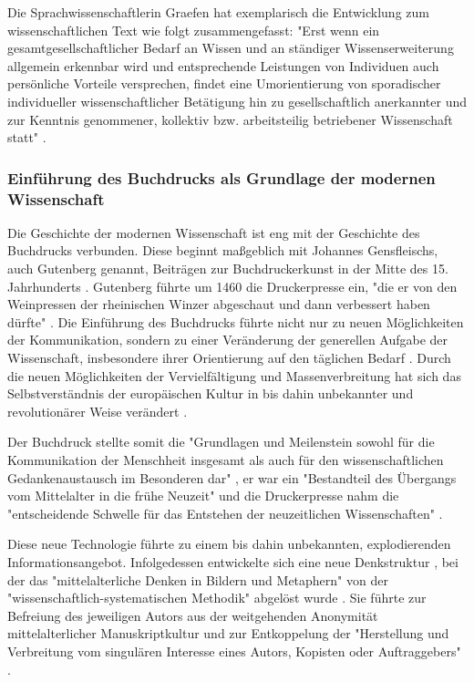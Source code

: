 Die Sprachwissenschaftlerin Graefen hat exemplarisch die Entwicklung zum wissenschaftlichen Text wie folgt zusammengefasst: "Erst wenn ein gesamtgesellschaftlicher Bedarf an Wissen und an ständiger Wissenserweiterung allgemein erkennbar wird und entsprechende Leistungen von Individuen auch persönliche Vorteile versprechen, findet eine Umorientierung von sporadischer individueller wissenschaftlicher Betätigung hin zu gesellschaftlich anerkannter und zur Kenntnis genommener, kollektiv bzw. arbeitsteilig betriebener Wissenschaft statt" \cite{Graefen_2007}.

\subsubsection{Einführung des Buchdrucks als Grundlage der modernen Wissenschaft}

Die Geschichte der modernen Wissenschaft ist eng mit der Geschichte des Buchdrucks verbunden. Diese beginnt maßgeblich mit Johannes Gensfleischs, auch Gutenberg genannt, Beiträgen zur Buchdruckerkunst in der Mitte des 15. Jahrhunderts \cite{Wittmann_1999}. Gutenberg führte um 1460 die Druckerpresse ein, "die er von den Weinpressen der rheinischen Winzer abgeschaut und dann verbessert haben dürfte" \cite{Stober_2014}. Die Einführung des Buchdrucks führte nicht nur zu neuen Möglichkeiten der Kommunikation, sondern zu einer Veränderung der generellen Aufgabe der Wissenschaft, insbesondere ihrer Orientierung auf den täglichen Bedarf \cite[:148]{Luhmann_1998}. Durch die neuen Möglichkeiten der Vervielfältigung und Massenverbreitung hat sich das Selbstverständnis der europäischen Kultur in bis dahin unbekannter \cite{Giesecke_1991} und revolutionärer Weise verändert \cite{Wunderlich_2008} \cite{Stober_2014} \cite[:211]{Porter_1964}.

Der Buchdruck stellte somit die "Grundlagen und Meilenstein sowohl für die Kommunikation der Menschheit insgesamt als auch für den wissenschaftlichen Gedankenaustausch im Besonderen dar" \cite{Schirmbacher_2009}, er war ein "Bestandteil des Übergangs vom Mittelalter in die frühe Neuzeit" \cite{Lange_2008} und die Druckerpresse nahm die "entscheidende Schwelle für das Entstehen der neuzeitlichen Wissenschaften" \cite{Luhmann_1997}.

Diese neue Technologie führte zu einem bis dahin unbekannten, explodierenden Informationsangebot. Infolgedessen entwickelte sich eine neue Denkstruktur \cite{Eisenstein_1997}, bei der das "mittelalterliche Denken in Bildern und Metaphern" von der "wissenschaftlich-systematischen Methodik" abgelöst wurde \cite{Wunderlich_2008}. Sie führte zur Befreiung des jeweiligen Autors aus der weitgehenden Anonymität mittelalterlicher Manuskriptkultur und zur Entkoppelung der "Herstellung und Verbreitung vom singulären Interesse eines Autors, Kopisten oder Auftraggebers" \cite{Wunderlich_2008} \cite{Schirmbacher_2009}.

